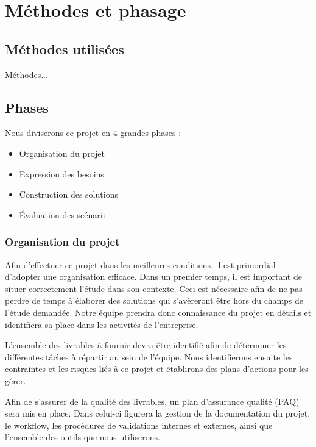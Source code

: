 \chapter{M\'ethodes et phasage}

\section{M\'ethodes utilis\'ees}


M\'ethodes...

\section{Phases}

Nous diviserons ce projet en 4 grandes phases :


\begin{itemize}
 \item Organisation du projet
 \item Expression des besoins
 \item Construction des solutions
 \item \'Evaluation des sc\'enarii
\end{itemize}


\subsection{Organisation du projet}

Afin d'effectuer ce projet dans les meilleures conditions, il est primordial d'adopter une organisation efficace.
Dans un premier temps, il est important de situer correctement l'\'etude dans son contexte. 
Ceci est n\'ecessaire afin de ne pas perdre de temps \`a \'elaborer des solutions qui s'av\`ereront \^etre hors du champs de l'\'etude demand\'ee.
Notre \'equipe prendra donc connaissance du projet en détails et identifiera sa place dans les activit\'es de l'entreprise.

L'ensemble des livrables \`a fournir devra \^etre identifi\'e afin de d\'eterminer les diff\'erentes t\^aches \`a r\'epartir au sein de l'\'equipe.
Nous identifierons ensuite les contraintes et les risques li\'es \`a ce projet et \'etablirons des plans d'actions pour les g\'erer.

Afin de s'assurer de la qualit\'e des livrables, un plan d'assurance qualit\'e (PAQ) sera mis en place. Dans celui-ci figurera la gestion de la documentation du projet,
le workflow, les proc\'edures de validations internes et externes, ainsi que l'ensemble des outils que nous utiliserons.

